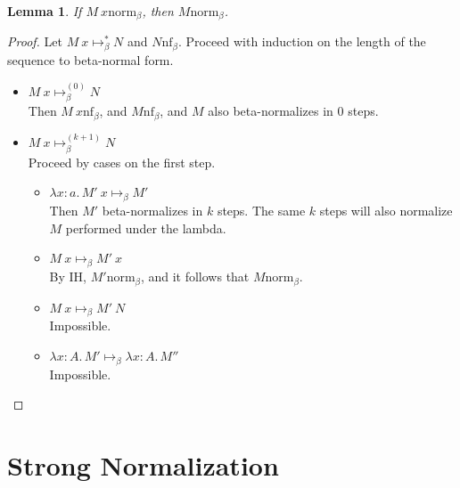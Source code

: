 \documentclass{article}
\newtheorem{lem}[thm]{Lemma}
\newcommand{\bnf}[1]{#1 \mathrel{\text{nf}_\beta}}
\newcommand{\bnorm}[1]{\ensuremath{#1 \mathrel{\text{norm}_\beta}}}
\newcommand{\stepb}[2]{\ensuremath{#1 \mapsto_{\beta} #2}}
\newcommand{\stepbs}[2]{\ensuremath{#1 \mapsto_{\beta}^* #2}}
\newcommand{\stepbk}[3]{\ensuremath{#1 \mapsto_{\beta}^{(#2)} #3}}
\newcommand{\ap}[2]{\ensuremath{#1\ #2}}
\newcommand{\lam}[3]{\ensuremath{\lambda #1 {:} #2.\, #3}}
\begin{document}
\begin{lem}\label{l6}
If \bnorm{\ap{M}{x}}, then \bnorm{M}.
\end{lem}

\begin{proof}
Let $\stepbs{\ap{M}{x}}{N}$ and $\bnf{N}$.
Proceed with induction on the length of the sequence to beta-normal form.
\begin{itemize}
  \setlength\itemsep{1em}
  \item $\stepbk{\ap{M}{x}}{0}{N}$\\
  Then $\bnf{\ap{M}{x}}$, and $\bnf{M}$, and $M$ also beta-normalizes in 0 steps. 
  \item $\stepbk{\ap{M}{x}}{k+1}{N}$\\
  Proceed by cases on the first step.
  \begin{itemize}
  \setlength\itemsep{1em}
  \item \stepb{\ap{\lam{x}{a}{M'}}{x}}{M'}\\
  Then $M'$ beta-normalizes in $k$ steps. The same $k$ steps will also normalize $M$ performed under the lambda.
  \item \stepb{\ap{M}{x}}{\ap{M'}{x}}\\
  By IH, \bnorm{M'}, and it follows that $\bnorm{M}$.
  \item \stepb{\ap{M}{x}}{\ap{M'}{N}}\\
  Impossible.
  \item \stepb{\lam{x}{A}{M'}}{\lam{x}{A}{M''}}\\
  Impossible.
  \end{itemize}
  
\end{itemize}
\end{proof}
\section{Strong Normalization}


\end{document}
